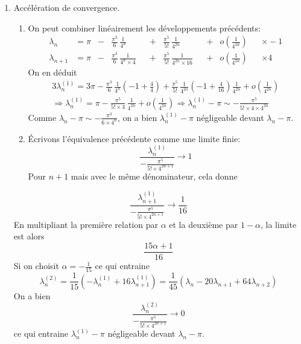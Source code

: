 \begin{enumerate}
 \item Accélération de convergence.
\begin{enumerate}
 \item On peut combiner linéairement les développements précédents:
\begin{align*}
 \lambda_n    &= \pi &-& \frac{\pi^3}{6}\,\frac{1}{4^n}         & &+& \frac{\pi^5}{5!}\,\frac{1}{4^{2n}}
  &  &+& o(\frac{1}{4^{2n}}) & &\times -1\\  
\lambda_{n+1} &= \pi &-& \frac{\pi^3}{6}\,\frac{1}{4^n\times 4} & &+& \frac{\pi^5}{5!}\,\frac{1}{4^{2n}\times 16}
  &  &+& o(\frac{1}{4^{2n}}) & &\times 4 
\end{align*}
 On en déduit
\begin{multline*}
 3\lambda_n^{(1)}= 3\pi
-\frac{\pi^3}{6}\,\frac{1}{4^n}\left(-1+\frac{4}{4} \right)
+\frac{\pi^5}{5!}\,\frac{1}{4^{2n}}\left(-1 +\frac{4}{16}\right) \frac{1}{4^{2n}}+o(\frac{1}{4^{2n}})\\\Rightarrow
\lambda_n^{(1)} = \pi -\frac{\pi^5}{5!\times 4}\,\frac{1}{4^{2n}} +o(\frac{1}{4^{2n}})
\Rightarrow 
\lambda_n^{(1)} - \pi \sim -\frac{\pi^5}{5!\times 4 \times 4^{2n}}
\end{multline*}
Comme $\lambda_n - \pi \sim -\frac{\pi^3}{6\times 4^n}$, on a bien $\lambda_n^{(1)} - \pi$ négligeable devant $\lambda_n - \pi$.

 \item  \'Ecrivons l'équivalence précédente comme une limite finie:
\begin{displaymath}
 \frac{\lambda_n^{(1)}}{-\frac{\pi^5}{5!\times 4^{2n+1}}} \rightarrow 1
\end{displaymath}
Pour $n+1$ mais avec le même dénominateur, cela donne
\end{enumerate}
\begin{displaymath}
 \frac{\lambda_{n+1}^{(1)}}{-\frac{\pi^5}{5!\times 4^{2n+1}}} \rightarrow \frac{1}{16}
\end{displaymath}
En multipliant la première relation par $\alpha$ et la deuxième par $1-\alpha$, la limite est alors
\begin{displaymath}
 \frac{15\alpha +1}{16}
\end{displaymath}
Si on choisit $\alpha = -\frac{1}{15}$ ce qui entraine
\begin{displaymath}
 \lambda_n^{(2)}=\frac{1}{15}\left( -\lambda_n^{(1)} +16\lambda_{n+1}^{(1)}\right) 
=\frac{1}{45}\left(\lambda_n -20 \lambda_{n+1} +64 \lambda_{n+2}\right) 
\end{displaymath}
On a bien
\begin{displaymath}
 \frac{\lambda_n^{(2)}}{-\frac{\pi^5}{5!\times 4^{2n+1}}} \rightarrow 0
\end{displaymath}
ce qui entraine $\lambda_n^{(1)} - \pi$ négligeable devant $\lambda_n - \pi$.
\end{enumerate}
